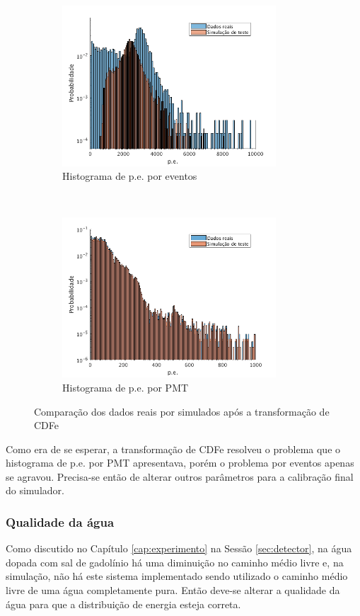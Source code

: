 \begin{figure}[ht]
	\centering
	\begin{subfigure}{0.5\textwidth}
		\centering
		\includegraphics[width=8cm]{textuais/simulacao/figuras/hist_evt2.png}
		\caption{Histograma de p.e. por eventos}
		\label{fig:a2}
	\end{subfigure}%
	~ 
	\begin{subfigure}{0.5\textwidth}
		\centering
		\includegraphics[width=8cm]{textuais/simulacao/figuras/hist_pmt2.png}
		\caption{Histograma de p.e. por PMT}
		\label{fig:b2}
	\end{subfigure}
	\caption{Comparação dos dados reais por simulados após a transformação de CDFe}
\end{figure}

Como era de se esperar, a transformação de CDFe resolveu o problema que o histograma de p.e. por PMT apresentava, porém o problema por eventos apenas se agravou. Precisa-se então de alterar outros parâmetros para a calibração final do simulador.

\subsubsection{Qualidade da água}

Como discutido no Capítulo \ref{cap:experimento} na Sessão \ref{sec:detector}, na água dopada com sal de gadolínio há uma diminuição no caminho médio livre e, na simulação, não há este sistema implementado sendo utilizado o caminho médio livre de uma água completamente pura. Então deve-se alterar a qualidade da água para que a distribuição de energia esteja correta.

